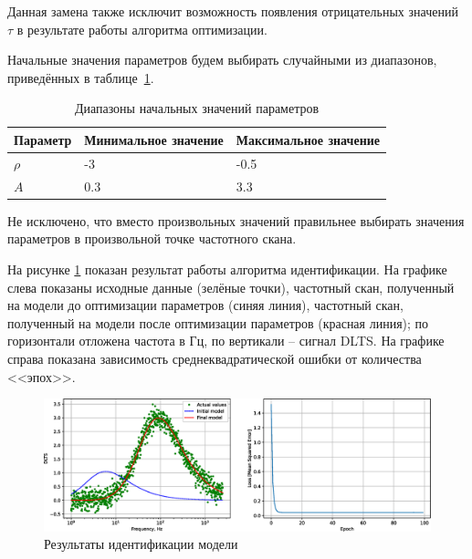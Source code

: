 \documentclass{report}
\begin{document}
        Данная замена также исключит возможность появления отрицательных значений 
        $\tau$ в результате работы алгоритма оптимизации.

        Начальные значения параметров будем выбирать случайными из диапазонов, 
        приведённых в таблице~\ref{table:table3}.

        \begin{table}[ht]
            \caption{Диапазоны начальных значений параметров}
            \label{table:table3}
            \centering
            \begin{tabular}{ | l | l | l | }
                \hline
                Параметр & Минимальное значение & Максимальное значение \\
                \hline
                $\rho$ & -3 & -0.5 \\
                \hline
                $A$ & 0.3 & 3.3 \\
                \hline
            \end{tabular}
        \end{table}
        
        Не исключено, что вместо произвольных значений правильнее выбирать 
        значения параметров в произвольной точке частотного скана.
        
        На рисунке \ref{pic:pic2} показан результат работы алгоритма идентификации.
        На графике слева показаны исходные данные (зелёные точки), частотный скан, 
        полученный на модели до оптимизации параметров (синяя линия), частотный 
        скан, полученный на модели после оптимизации параметров (красная линия); 
        по горизонтали отложена частота в Гц, по вертикали -- сигнал DLTS. 
        На графике справа показана зависимость среднеквадратической ошибки от 
        количества <<эпох>>.

        \begin{figure}[ht]
            \centering
            \includegraphics[width=\textwidth]{SGD}
            \caption{Результаты идентификации модели}
            \label{pic:pic2}
        \end{figure}
\end{document}
